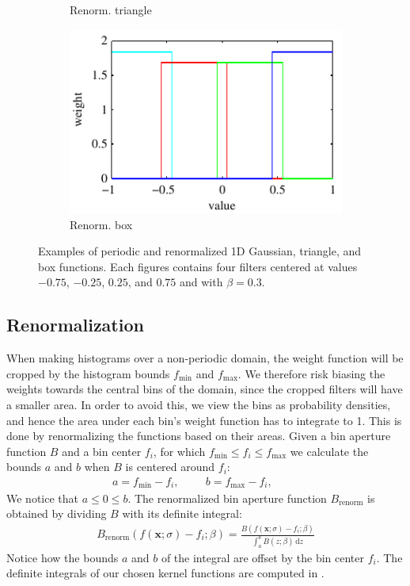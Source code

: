 \documentclass[thesis.tex]{subfiles}
\def\x{\mathbf{x}}
\begin{document}
\begin{figure}[tb]
\begin{subfigure}[t]{0.32\textwidth}
		\caption{Renorm. triangle}
		\label{fig:1dFilterTriangleRenorm}
	\end{subfigure}
	\begin{subfigure}[t]{0.32\textwidth}
		\includegraphics[width=\textwidth]{img/binFilterBoxRenorm.pdf}
		\caption{Renorm. box}
		\label{fig:1dFilterBoxRenorm}
	\end{subfigure}
	\caption{Examples of periodic and renormalized 1D Gaussian, triangle, and box functions. Each figures contains four filters centered at values $-0.75$, $-0.25$, $0.25$, and $0.75$ and with $\beta = 0.3$.}
	\label{fig:1dFilters}
\end{figure}

\subsection{Renormalization}
When making histograms over a non-periodic domain, the weight function will be cropped by the histogram bounds $f_\text{min}$ and $f_\text{max}$. We therefore risk biasing the weights towards the central bins of the domain, since the cropped filters will have a smaller area. In order to avoid this, we view the bins as probability densities, and hence the area under each bin's weight function has to integrate to 1. This is done by renormalizing the functions based on their areas. Given a bin aperture function $B$ and a bin center $f_i$, for which $f_\text{min} \leq f_i \leq f_\text{max}$ we calculate the bounds $a$ and $b$ when $B$ is centered around $f_i$:
\begin{align*}
	a = f_\text{min} - f_i,\hspace{1cm}
	b = f_\text{max} - f_i,\hspace{1cm}
\end{align*}
We notice that $a \leq 0 \leq b$. The renormalized bin aperture function $B_\text{renorm}$ is obtained by dividing $B$ with its definite integral:
\begin{align*}
	B_\text{renorm}\left( f(\x;\sigma)-f_i;\beta \right) = \frac{B \left(f(\x;\sigma)-f_i;\beta \right)}{\int_a^b B \left( z;\beta \right)\,\text{d}z}
\end{align*}
Notice how the bounds $a$ and $b$ of the integral are offset by the bin center $f_i$. The definite integrals of our chosen kernel functions are computed in .
\end{document}
